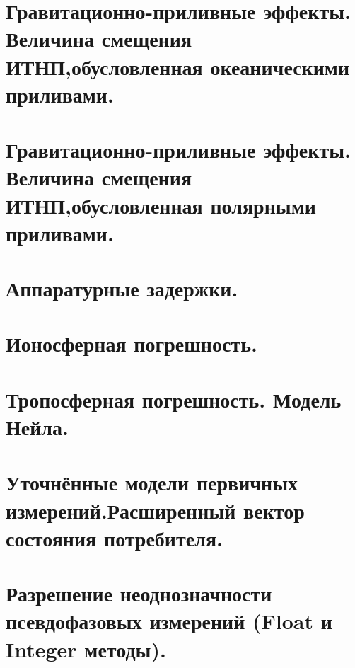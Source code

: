 \documentclass[14pt,a4paper,oneside]{extarticle}
\begin{document}
\section{Гравитационно-приливные эффекты. Величина смещения ИТНП,обусловленная океаническими приливами.}
\section{Гравитационно-приливные эффекты. Величина смещения ИТНП,обусловленная полярными приливами.}
\section{Аппаратурные задержки.}
\section{Ионосферная погрешность.}
\section{Тропосферная погрешность. Модель Нейла.}
\section{Уточнённые модели первичных измерений.Расширенный вектор состояния потребителя.}
\section{Разрешение неоднозначности псевдофазовых измерений (Float и Integer методы).}
\end{document}
